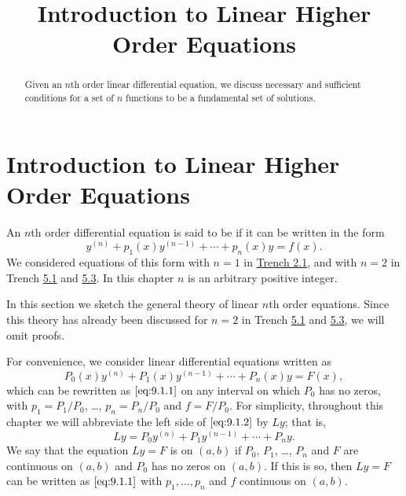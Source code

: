 \documentclass{ximera}
\title{Introduction to Linear Higher Order Equations}%
\begin{document}
\begin{abstract}
Given an $n$th order linear differential equation, we discuss necessary and sufficient conditions for a set of $n$ functions to be a fundamental set of solutions.
\end{abstract}

\maketitle

\section*{Introduction to Linear Higher Order Equations}

An $n$th order differential equation is said to be  if it
can be written in the form
\begin{equation}\label{eq:9.1.1}
y^{(n)}+p_1(x)y^{(n-1)}+\cdots+p_n(x)y=f(x).
\end{equation}
We considered equations of this form with $n=1$ in
\href{https://xerxes.ximera.org/differentialequations/main/separableEquations/separableEquations}{Trench 2.1}, and with $n=2$ in
Trench \href{https://xerxes.ximera.org/differentialequations/main/homogeneousLinearEquations/homogeneousLinearEquations}{5.1} and \href{https://xerxes.ximera.org/differentialequations/main/nonHomogeneousLinear/nonHomogeneousLinear}{5.3}. In this chapter $n$ is an arbitrary
positive integer.

In this section we sketch the general theory of linear $n$th order equations. Since this theory has already been discussed for $n=2$ in Trench \href{https://xerxes.ximera.org/differentialequations/main/homogeneousLinearEquations/homogeneousLinearEquations}{5.1} and \href{https://xerxes.ximera.org/differentialequations/main/nonHomogeneousLinear/nonHomogeneousLinear}{5.3}, we will omit
proofs.

For convenience, we consider linear differential equations written
as
\begin{equation}\label{eq:9.1.2}
P_0(x)y^{(n)}+P_1(x)y^{(n-1)}+\cdots+P_n(x)y=F(x),
\end{equation}
which can be rewritten as $\eqref{eq:9.1.1}$ on any interval on which $P_0$ has no zeros, with $p_1=P_1/P_0$, \dots, $p_n=P_n/P_0$ and
$f=F/P_0$. For simplicity, throughout this chapter we will
abbreviate the left side of $\eqref{eq:9.1.2}$ by $Ly$; that is,
$$
Ly=P_0y^{(n)}+P_1y^{(n-1)}+\cdots+P_ny.
$$
We say that the equation $Ly=F$ is  on $(a,b)$ if
$P_0$, $P_1$, \dots, $P_n$ and $F$ are continuous on $(a,b)$ and $P_0$ has
no zeros on $(a,b)$. If this is so, then $Ly=F$ can be
written as $\eqref{eq:9.1.1}$ with $p_1, \dots, p_n$ and $f$ continuous on
$(a,b)$.
\end{document}
